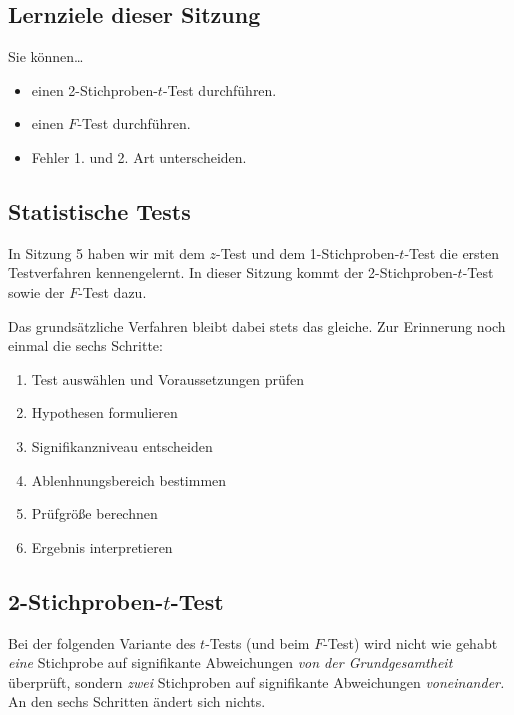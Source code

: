 \documentclass[
  ngerman,
]{article}
\providecommand{\tightlist}{%
  \setlength{\itemsep}{0pt}\setlength{\parskip}{0pt}}
\begin{document}
\hypertarget{lernziele-dieser-sitzung-5}{%
\subsection{Lernziele dieser Sitzung}\label{lernziele-dieser-sitzung-5}}

Sie können\ldots{}

\begin{itemize}
\tightlist
\item
  einen 2-Stichproben-\(t\)-Test durchführen.
\item
  einen \(F\)-Test durchführen.
\item
  Fehler 1. und 2. Art unterscheiden.
\end{itemize}

\hypertarget{statistische-tests-1}{%
\subsection{Statistische Tests}\label{statistische-tests-1}}

In Sitzung 5 haben wir mit dem \(z\)-Test und dem 1-Stichproben-\(t\)-Test die ersten Testverfahren kennengelernt. In dieser Sitzung kommt der 2-Stichproben-\(t\)-Test sowie der \(F\)-Test dazu.

Das grundsätzliche Verfahren bleibt dabei stets das gleiche. Zur Erinnerung noch einmal die sechs Schritte:

\begin{enumerate}
\def\labelenumi{\arabic{enumi}.}
\tightlist
\item
  Test auswählen und Voraussetzungen prüfen
\item
  Hypothesen formulieren
\item
  Signifikanzniveau entscheiden
\item
  Ablenhnungsbereich bestimmen
\item
  Prüfgröße berechnen
\item
  Ergebnis interpretieren
\end{enumerate}

\hypertarget{stichproben-t-test-1}{%
\subsection{\texorpdfstring{2-Stichproben-\(t\)-Test}{2-Stichproben-t-Test}}\label{stichproben-t-test-1}}

Bei der folgenden Variante des \(t\)-Tests (und beim \(F\)-Test) wird nicht wie gehabt \emph{eine} Stichprobe auf signifikante Abweichungen \emph{von der Grundgesamtheit} überprüft, sondern \emph{zwei} Stichproben auf signifikante Abweichungen \emph{voneinander.} An den sechs Schritten ändert sich nichts.
\end{document}
